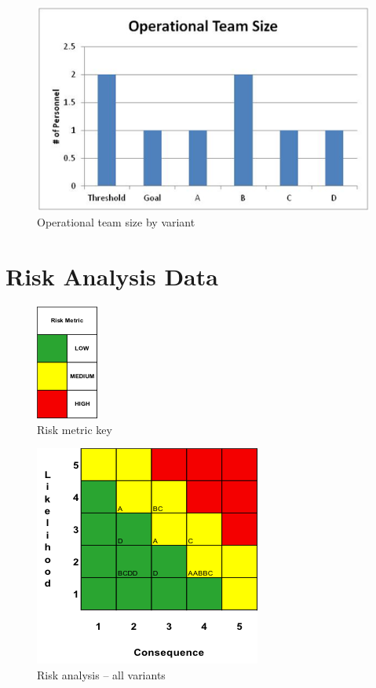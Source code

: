 \documentclass[letterpaper,10pt]{article}
\begin{document}
\begin{figure}[h!tbp]
	\begin{center}
		\includegraphics[scale=0.8]{images/operationalTeamSize.png}
	\end{center}
	\caption{Operational team size by variant}
	\label{fig:operationalTeamSize}
\end{figure}
\pagebreak

\section{Risk Analysis Data}
\label{sec:riskAnalysisData}
\begin{figure}[h!tbp]
	\begin{center}
		\includegraphics[scale=1]{images/riskMetricKey.png}
	\end{center}
	\caption{Risk metric key}
	\label{fig:riskMetricKey}
\end{figure}

\begin{figure}[h!tbp]
	\begin{center}
		\includegraphics[scale=1]{images/riskAnalysisAll.png}
	\end{center}
	\caption{Risk analysis -- all variants}
	\label{fig:riskAnalysisAll}
\end{figure}
\end{document}
